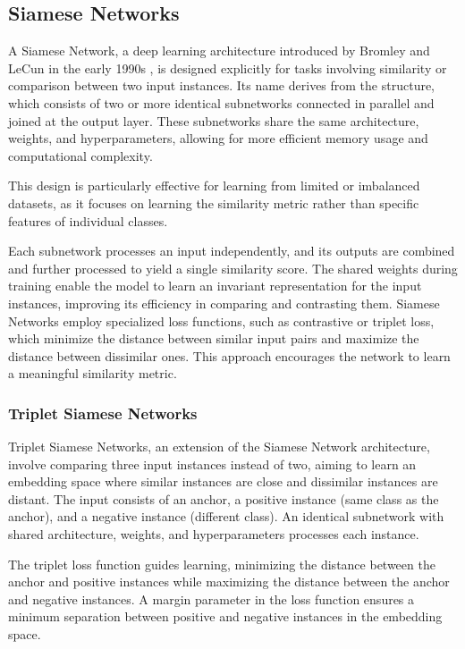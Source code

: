 \subsection{Siamese Networks}

A Siamese Network, a deep learning architecture introduced by Bromley and LeCun in the early 1990s \cite{Bromley1993SignatureNetwork}, is designed explicitly for tasks involving similarity or comparison between two input instances. Its name derives from the structure, which consists of two or more identical subnetworks connected in parallel and joined at the output layer. These subnetworks share the same architecture, weights, and hyperparameters, allowing for more efficient memory usage and computational complexity. 

This design is particularly effective for learning from limited or imbalanced datasets, as it focuses on learning the similarity metric rather than specific features of individual classes.

Each subnetwork processes an input independently, and its outputs are combined and further processed to yield a single similarity score. The shared weights during training enable the model to learn an invariant representation for the input instances, improving its efficiency in comparing and contrasting them. Siamese Networks employ specialized loss functions, such as contrastive or triplet loss, which minimize the distance between similar input pairs and maximize the distance between dissimilar ones. This approach encourages the network to learn a meaningful similarity metric.


\subsubsection{Triplet Siamese Networks}

Triplet Siamese Networks, an extension of the Siamese Network architecture, involve comparing three input instances instead of two, aiming to learn an embedding space where similar instances are close and dissimilar instances are distant. The input consists of an anchor, a positive instance (same class as the anchor), and a negative instance (different class). An identical subnetwork with shared architecture, weights, and hyperparameters processes each instance.

The triplet loss function guides learning, minimizing the distance between the anchor and positive instances while maximizing the distance between the anchor and negative instances. A margin parameter in the loss function ensures a minimum separation between positive and negative instances in the embedding space.

